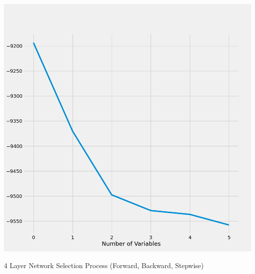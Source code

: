 \documentclass{article}
\begin{document}
	\includegraphics[scale = 0.2]{../plots/python/AICConcreteStepwise3L.png}
	
	4 Layer Network Selection Process (Forward, Backward, Stepwise)
	
\end{document}
